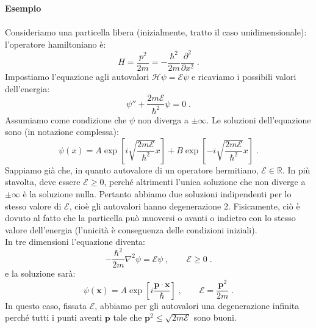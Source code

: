 \documentclass[10pt,a4paper]{report}
\theoremstyle{definition}
\newcommand{\ham}{\mathcal{H}}
\numberwithin{equation}{section}
\begin{document}
\textbf{Esempio} \\
\\
Consideriamo una particella libera (inizialmente, tratto il caso unidimensionale): l'operatore hamiltoniano è:
$$
H=\frac{p^2}{2m}=-\frac{\hbar^2}{2m}\frac{\partial^2}{\partial x^2}\;.
$$
Impostiamo l'equazione agli autovalori $\ham \psi=\mathcal{E}\psi$ e ricaviamo i possibili valori dell'energia:
$$
\psi''+\frac{2m\mathcal{E}}{\hbar^2}\psi=0\;.
$$
Assumiamo come condizione che $\psi$ non diverga a $\pm\infty$. Le soluzioni dell'equazione sono (in notazione complessa):
\begin{equation}
\psi(x)=A\exp\left[i\sqrt{\frac{2m\mathcal{E}}{\hbar^2}}x\right]+B\exp\left[-i\sqrt{\frac{2m\mathcal{E}}{\hbar^2}}x\right]\;.
\end{equation}
Sappiamo già che, in quanto autovalore di un operatore hermitiano, $\mathcal{E}\in\mathbb{R}$. In più stavolta, deve essere $\mathcal{E}\ge 0$, perché altrimenti l'unica soluzione che non diverge a $\pm\infty$ è la soluzione nulla. Pertanto abbiamo due soluzioni indipendenti per lo stesso valore di $\mathcal{E}$, cioè gli autovalori hanno degenerazione 2. Fisicamente, ciò è dovuto al fatto che la particella può muoversi o avanti o indietro con lo stesso valore dell'energia (l'unicità è conseguenza delle condizioni iniziali). \\
In tre dimensioni l'equazione diventa:
$$
-\frac{\hbar^2}{2m}\nabla^2\psi=\mathcal{E}\psi\;,\qquad \mathcal{E}\ge 0\;.
$$
e la soluzione sarà:
$$
\psi(\mathbf{x})=A\exp\left[i\frac{\mathbf{p}\cdot \mathbf{x}}{\hbar}\right]\;, \qquad \mathcal{E}=\frac{\mathbf{p}^2}{2m}\;.
$$
In questo caso, fissata $\mathcal{E}$, abbiamo per gli autovalori una degenerazione infinita perché tutti i punti aventi $\mathbf{p}$ tale che $\mathbf{p}^2\le \sqrt{2m\mathcal{E}}$ sono buoni.
\end{document}
